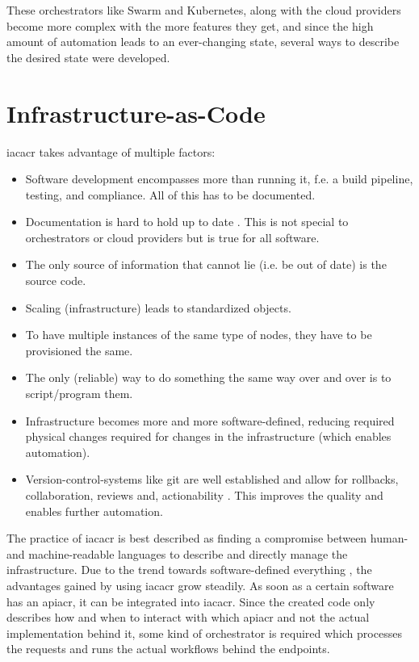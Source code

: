 \newline
These orchestrators like Swarm and Kubernetes, along with the cloud providers become more complex with the more features they get, and since the high amount of automation leads to an ever-changing state, several ways to describe the desired state were developed.



\section{Infrastructure-as-Code}
\Gls{iacacr} takes advantage of multiple factors:
\begin{itemize}
  \item Software development encompasses more than running it, f.e. a build pipeline, testing, and compliance. All of this has to be documented.
  \item Documentation is hard to hold up to date \cite{software_engineers_documentation} \cite{software_documentation_issues}. This is not special to orchestrators or cloud providers but is true for all software.
  \item The only source of information that cannot lie (i.e. be out of date) is the source code.
  \item Scaling (infrastructure) leads to standardized objects.
  \item To have multiple instances of the same type of nodes, they have to be provisioned the same.
  \item The only (reliable) way to do something the same way over and over is to script/program them.
  \item Infrastructure becomes more and more software-defined, reducing required physical changes required for changes in the infrastructure (which enables automation).
  \item Version-control-systems like git are well established and allow for rollbacks, collaboration, reviews and, actionability \cite{iac_oreilly}. This improves the quality and enables further automation.
\end{itemize}
The practice of \gls{iacacr} is best described as finding a compromise between human- and machine-readable languages to describe and directly manage the infrastructure.
\newline
Due to the trend towards software-defined everything \cite{sde_deloitte} \cite{sde_researchgate}, the advantages gained by using \gls{iacacr} grow steadily. As soon as a certain software has an \gls{apiacr}, it can be integrated into \gls{iacacr}. Since the created code only describes how and when to interact with which \gls{apiacr} and not the actual implementation behind it, some kind of orchestrator is required which processes the requests and runs the actual workflows behind the endpoints.
